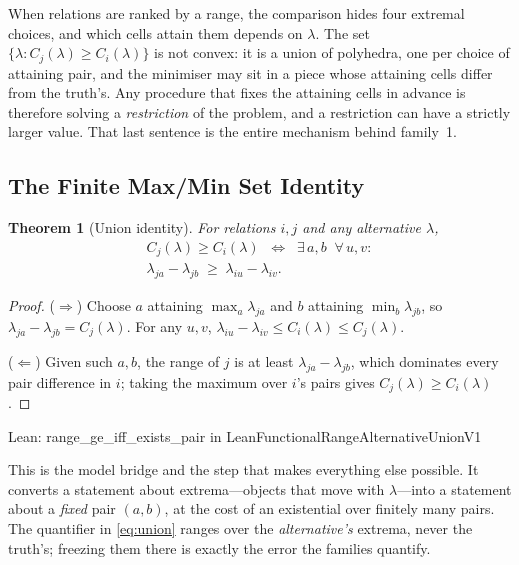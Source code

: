 \documentclass[conference]{IEEEtran}
\newtheorem{theorem}{Theorem}
\theoremstyle{definition}
\newcommand{\lean}[1]{\textsf{\footnotesize #1}}
\newcommand{\leanbox}[1]{%
  \par\vspace{2pt}\noindent
  {\footnotesize\textsf{Lean: #1}}\par\vspace{2pt}}
\begin{document}
When relations are ranked by a range, the comparison hides four extremal choices, and which
cells attain them depends on $\lambda$. The set $\{\lambda:C_{j}(\lambda)\ge C_{i}(\lambda)\}$
is not convex: it is a union of polyhedra, one per choice of attaining pair, and the
minimiser may sit in a piece whose attaining cells differ from the truth's. Any procedure
that fixes the attaining cells in advance is therefore solving a \emph{restriction} of the
problem, and a restriction can have a strictly larger value. That last sentence is the entire
mechanism behind family~1.

\subsection{The Finite Max/Min Set Identity}
\label{sec:union}

\begin{theorem}[Union identity]
\label{thm:union}
For relations $i,j$ and any alternative $\lambda$,
\begin{multline}
C_{j}(\lambda)\geq C_{i}(\lambda)
\;\;\Longleftrightarrow\;\;
\exists\,a,b\;\;\forall\,u,v:\\
\lambda_{ja}-\lambda_{jb}\;\geq\;\lambda_{iu}-\lambda_{iv}.
\label{eq:union}
\end{multline}
\end{theorem}

\begin{proof}
($\Rightarrow$) Choose $a$ attaining $\max_{a}\lambda_{ja}$ and $b$ attaining
$\min_{b}\lambda_{jb}$, so $\lambda_{ja}-\lambda_{jb}=C_{j}(\lambda)$. For any $u,v$,
$\lambda_{iu}-\lambda_{iv}\le C_{i}(\lambda)\le C_{j}(\lambda)$.

($\Leftarrow$) Given such $a,b$, the range of $j$ is at least $\lambda_{ja}-\lambda_{jb}$,
which dominates every pair difference in $i$; taking the maximum over $i$'s pairs gives
$C_{j}(\lambda)\ge C_{i}(\lambda)$.
\end{proof}

\leanbox{\lean{range\_ge\_iff\_exists\_pair} in
\lean{LeanFunctionalRangeAlternativeUnionV1}}

This is the model bridge and the step that makes everything else possible. It converts a
statement about extrema---objects that move with $\lambda$---into a statement about a
\emph{fixed} pair $(a,b)$, at the cost of an existential over finitely many pairs. The
quantifier in \eqref{eq:union} ranges over the \emph{alternative's} extrema, never the
truth's; freezing them there is exactly the error the families quantify.
\end{document}
